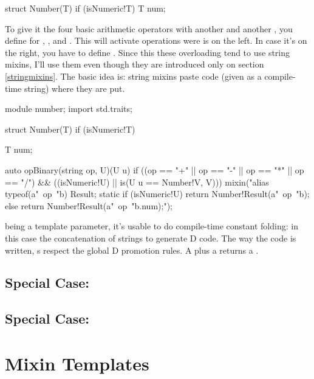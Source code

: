 \begin{dcode}
struct Number(T) if (isNumeric!T)
{
    T num;
}
\end{dcode}

To give it the four basic arithmetic operators with another  and another , you define  for \DD{+}, \DD{-}, \DD{*} and \DD{/}. This will activate operations were  is on the left. In case it's on the right, you have to define . Since this these overloading tend to use string mixins, I'll use them even though they are introduced only on section \ref{stringmixins}. The basic idea is: string mixins paste code (given as a compile-time string) where they are put.

\begin{dcode}
module number;
import std.traits;

struct Number(T) if (isNumeric!T)
{
    T num;

    auto opBinary(string op, U)(U u) 
         if ((op == "+" || op == "-" || op == "*" || op == "/") 
         && ((isNumeric!U) || is(U u == Number!V, V)))
    {
 mixin("alias typeof(a"~op~"b) Result;     
        static if (isNumeric!U)
            return Number!Result(a"~op~"b);
        else
            return Number!Result(a"~op~"b.num);");
    }    
}
\end{dcode}

 being a template parameter, it's usable to do compile-time constant folding: in this case the concatenation of strings to generate D code. The way the code is written, s respect the global D promotion rules. A  plus a  returns a .

\subsection{\texorpdfstring{Special Case: }
                           {Special Case: in}}
                           
\subsection{\texorpdfstring{Special Case: }
                           {Special Case: cast}}

\section{Mixin Templates}\label{mixintemplates}

